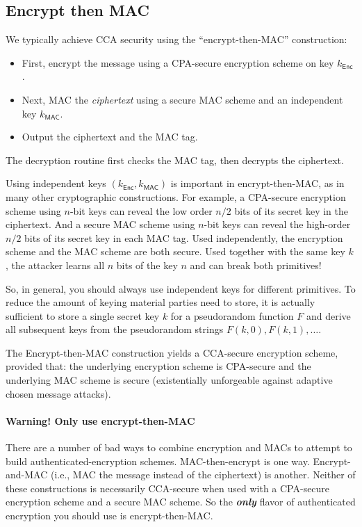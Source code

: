 \subsection{Encrypt then MAC}
We typically achieve CCA security using the ``encrypt-then-MAC'' construction:
\begin{itemize}
  \item First, encrypt the message using a CPA-secure encryption scheme on key $k_\mathsf{Enc}$.
  \item Next, MAC the \emph{ciphertext} using a secure MAC scheme and an independent key 
    $k_\mathsf{MAC}$.
  \item Output the ciphertext and the MAC tag.
\end{itemize}
The decryption routine first checks the MAC tag, then decrypts the ciphertext.

Using independent keys $(k_\mathsf{Enc}, k_\mathsf{MAC})$ is important 
in encrypt-then-MAC, as in many other cryptographic constructions.
For example, a CPA-secure encryption scheme using $n$-bit keys can reveal
the low order $n/2$ bits of its secret key in the ciphertext.
And a secure MAC scheme using $n$-bit keys can reveal the high-order
$n/2$ bits of its secret key in each MAC tag.
Used independently, the encryption scheme and the MAC scheme are both
secure.
Used together with the same key $k$, the attacker learns all $n$ bits
of the key $n$ and can break both primitives!

So, in general, you should always use independent keys for different primitives.
To reduce the amount of keying material parties need to store, it is actually 
sufficient to store a single secret key $k$ for a pseudorandom function $F$
and derive all subsequent keys from the pseudorandom strings $F(k, 0), F(k, 1), \dots$.

\begin{theorem}[Informal]
The Encrypt-then-MAC construction yields a CCA-secure encryption scheme,
provided that: the underlying encryption scheme is CPA-secure and the
underlying MAC scheme is secure (existentially unforgeable against adaptive chosen message attacks).
\end{theorem}

\paragraph{Warning! \textbf{Only} use encrypt-then-MAC}
There are a number of bad ways to combine encryption and MACs to attempt to
build authenticated-encryption schemes.
MAC-then-encrypt is one way. Encrypt-and-MAC (i.e., MAC the message
instead of the ciphertext) is another.
Neither of these constructions is necessarily CCA-secure when used with a
CPA-secure encryption scheme and a secure MAC scheme.
So the \emph{\textbf{only}} flavor of authenticated encryption you should use
is encrypt-then-MAC.

